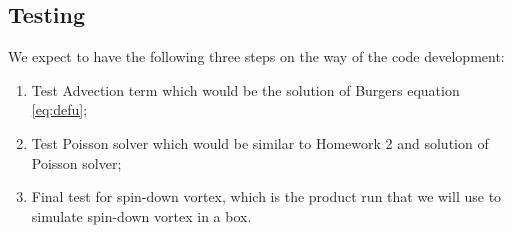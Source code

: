 \documentclass{article}
\begin{document}
\subsection{Testing}

We expect to have the following three steps on the way of the code development:
\begin{enumerate}
	\item Test Advection term which would be the solution of Burgers equation \eqref{eq:defu};
	\item Test Poisson solver which would be similar to Homework 2 and solution of Poisson solver;
	\item Final test for spin-down vortex, which is the product run that we will use to simulate spin-down vortex in a box.
\end{enumerate}



\end{document}
